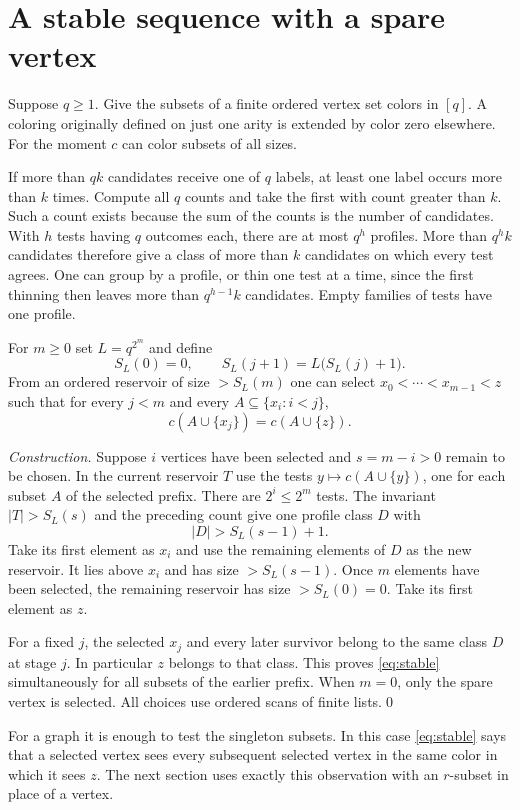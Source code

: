 \documentclass[11pt,letterpaper]{article}
\newcommand{\head}[1]{\section{#1}}
\newcommand{\point}[1]{\par\smallskip{\bfseries\color{ink}#1.}\enspace}
\begin{document}
\head{A stable sequence with a spare vertex}\label{s:stabilize}
Suppose $q\ge1$. Give the subsets of a finite ordered vertex set colors in $[q]$. A coloring originally defined on just one arity is extended by color zero elsewhere. For the moment $c$ can color subsets of all sizes.

\point{Finite thinning} If more than $qk$ candidates receive one of $q$ labels, at least one label occurs more than $k$ times. Compute all $q$ counts and take the first with count greater than $k$. Such a count exists because the sum of the counts is the number of candidates. With $h$ tests having $q$ outcomes each, there are at most $q^h$ profiles. More than $q^h k$ candidates therefore give a class of more than $k$ candidates on which every test agrees. One can group by a profile, or thin one test at a time, since the first thinning then leaves more than $q^{h-1}k$ candidates. Empty families of tests have one profile.

\point{Reservoir lemma} For $m\ge0$ set $L=q^{2^m}$ and define
\[
  S_L(0)=0,\qquad S_L(j+1)=L\bigl(S_L(j)+1\bigr).
\]
From an ordered reservoir of size $>S_L(m)$ one can select
$x_0<\cdots<x_{m-1}<z$ such that for every $j<m$ and every $A\subseteq\{x_i:i<j\}$,
\begin{equation}
         c(A\cup\{x_j\})=c(A\cup\{z\}).                 \tag{1}\label{eq:stable}
\end{equation}

\emph{Construction.} Suppose $i$ vertices have been selected and $s=m-i>0$ remain to be chosen. In the current reservoir $T$ use the tests $y\mapsto c(A\cup\{y\})$, one for each subset $A$ of the selected prefix. There are $2^i\le2^m$ tests. The invariant $|T|>S_L(s)$ and the preceding count give one profile class $D$ with
\[
               |D|>S_L(s-1)+1.
\]
Take its first element as $x_i$ and use the remaining elements of $D$ as the new reservoir. It lies above $x_i$ and has size $>S_L(s-1)$. Once $m$ elements have been selected, the remaining reservoir has size $>S_L(0)=0$. Take its first element as $z$.

For a fixed $j$, the selected $x_j$ and every later survivor belong to the same class $D$ at stage $j$. In particular $z$ belongs to that class. This proves \eqref{eq:stable} simultaneously for all subsets of the earlier prefix. When $m=0$, only the spare vertex is selected. All choices use ordered scans of finite lists.\qed

For a graph it is enough to test the singleton subsets. In this case \eqref{eq:stable} says that a selected vertex sees every subsequent selected vertex in the same color in which it sees $z$. The next section uses exactly this observation with an $r$-subset in place of a vertex.
\clearpage
\end{document}
